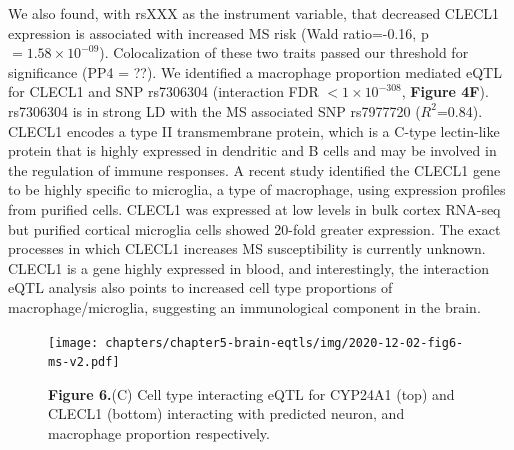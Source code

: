 We also found, with rsXXX as the instrument variable, that decreased CLECL1 expression is associated with increased MS risk (Wald ratio=-0.16, p$= 1.58 \times 10^{-09}$). Colocalization of these two traits passed our threshold for significance (PP4 = ??). We identified a macrophage proportion mediated eQTL for CLECL1 and SNP rs7306304 (interaction FDR $< 1 \times 10^{-308}$, \textbf{Figure 4F}). rs7306304 is in strong LD with the MS associated SNP rs7977720 ($R^2$=0.84)\cite{consortium*+MultipleSclerosisGenomic2019}. CLECL1 encodes a type II transmembrane protein, which is a C-type lectin-like protein that is highly expressed in dendritic and B cells and may be involved in the regulation of immune responses\cite{vanluijnMultipleSclerosisassociatedCLEC16A2015}. A recent study identified the CLECL1 gene to be highly specific to microglia, a type of macrophage, using expression profiles from purified cells. CLECL1 was expressed at low levels in bulk cortex RNA-seq but purified cortical microglia cells showed 20-fold greater expression\cite{vanluijnMultipleSclerosisassociatedCLEC16A2015}. The exact processes in which CLECL1 increases MS susceptibility is currently unknown. CLECL1 is a gene highly expressed in blood, and interestingly, the interaction eQTL analysis also points to increased cell type proportions of macrophage/microglia, suggesting an immunological component in the brain.  

\begin{figure}[H]
	\texttt{[image: chapters/chapter5-brain-eqtls/img/2020-12-02-fig6-ms-v2.pdf]}
	\caption{\textbf{Figure 6.}(C) Cell type interacting eQTL for CYP24A1 (top) and CLECL1 (bottom) interacting with predicted neuron, and macrophage proportion respectively. }
\end{figure}

